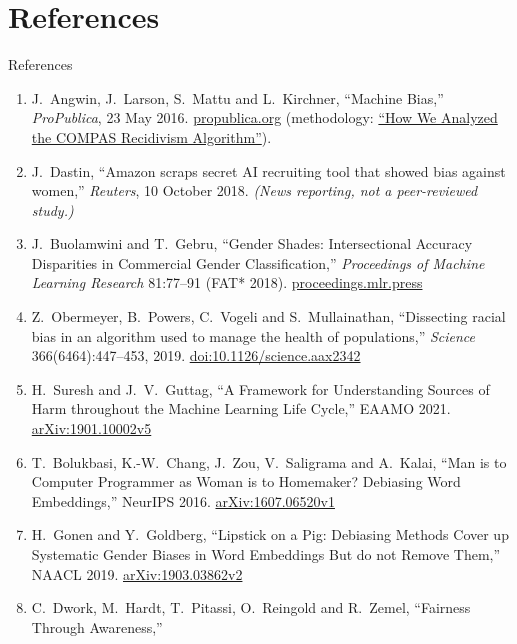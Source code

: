 \section{References}

\begin{frame}[allowframebreaks]{References}
  \footnotesize
  \begin{enumerate}
    \item J.~Angwin, J.~Larson, S.~Mattu and L.~Kirchner, ``Machine Bias,'' \emph{ProPublica},
          23 May 2016.
          \href{https://www.propublica.org/article/machine-bias-risk-assessments-in-criminal-sentencing}{propublica.org}
          (methodology: \href{https://www.propublica.org/article/how-we-analyzed-the-compas-recidivism-algorithm}{``How We Analyzed the COMPAS Recidivism Algorithm''}).
    \item J.~Dastin, ``Amazon scraps secret AI recruiting tool that showed bias against women,''
          \emph{Reuters}, 10 October 2018. \emph{(News reporting, not a peer-reviewed study.)}
    \item J.~Buolamwini and T.~Gebru, ``Gender Shades: Intersectional Accuracy Disparities in
          Commercial Gender Classification,'' \emph{Proceedings of Machine Learning Research}
          81:77--91 (FAT* 2018).
          \href{https://proceedings.mlr.press/v81/buolamwini18a.html}{proceedings.mlr.press}
    \item Z.~Obermeyer, B.~Powers, C.~Vogeli and S.~Mullainathan, ``Dissecting racial bias in an
          algorithm used to manage the health of populations,'' \emph{Science}
          366(6464):447--453, 2019. \href{https://doi.org/10.1126/science.aax2342}{doi:10.1126/science.aax2342}
    \item H.~Suresh and J.~V.~Guttag, ``A Framework for Understanding Sources of Harm throughout
          the Machine Learning Life Cycle,'' EAAMO 2021.
          \href{https://arxiv.org/abs/1901.10002v5}{arXiv:1901.10002v5}
    \item T.~Bolukbasi, K.-W.~Chang, J.~Zou, V.~Saligrama and A.~Kalai, ``Man is to Computer
          Programmer as Woman is to Homemaker? Debiasing Word Embeddings,'' NeurIPS 2016.
          \href{https://arxiv.org/abs/1607.06520v1}{arXiv:1607.06520v1}
    \item H.~Gonen and Y.~Goldberg, ``Lipstick on a Pig: Debiasing Methods Cover up Systematic
          Gender Biases in Word Embeddings But do not Remove Them,'' NAACL 2019.
          \href{https://arxiv.org/abs/1903.03862v2}{arXiv:1903.03862v2}
    \item C.~Dwork, M.~Hardt, T.~Pitassi, O.~Reingold and R.~Zemel, ``Fairness Through Awareness,''

\end{enumerate}
\end{frame}
